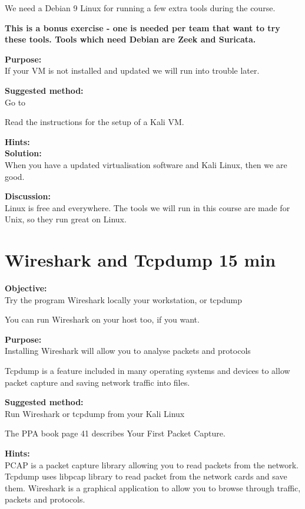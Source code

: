 \documentclass[a4paper,11pt,notitlepage]{report}
\begin{document}
We need a Debian 9 Linux for running a few extra tools during the course.

{\Large \bf This is a bonus exercise - one is needed per team that want to try these tools. Tools which need Debian are Zeek and Suricata.}

{\bf Purpose:}\\
If your VM is not installed and updated we will run into trouble later.

{\bf Suggested method:}\\
Go to 

Read the instructions for the setup of a Kali VM.

{\bf Hints:}\\

{\bf Solution:}\\
When you have a updated virtualisation software and Kali Linux, then we are good.

{\bf Discussion:}\\
Linux is free and everywhere. The tools we will run in this course are made for Unix, so they run great on Linux.



\chapter{Wireshark and Tcpdump 15 min}
\label{ex:wireshark-install}



{\bf Objective:}\\
Try the program Wireshark locally your workstation, or tcpdump

You can run Wireshark on your host too, if you want.

{\bf Purpose:}\\
Installing Wireshark will allow you to analyse packets and protocols

Tcpdump is a feature included in many operating systems and devices to allow packet capture and saving network traffic into files.

{\bf Suggested method:}\\
Run Wireshark or tcpdump from your Kali Linux

The PPA book page 41 describes Your First Packet Capture.

{\bf Hints:}\\
PCAP is a packet capture library allowing you to read packets from the network.
Tcpdump uses libpcap library to read packet from the network cards and save them.
Wireshark is a graphical application to allow you to browse through traffic, packets and protocols.
\end{document}
